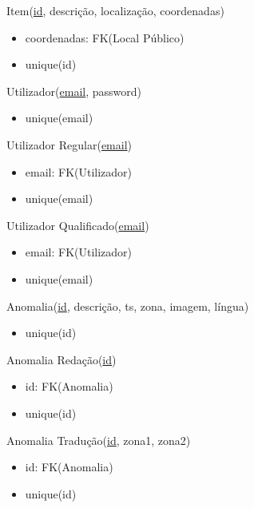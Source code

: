 \documentclass[12pt]{report}
\begin{document}
\begin{multicols}{2}
Item(\underline{id}, descrição, localização, coordenadas)
    \begin{itemize}
    \item coordenadas: FK(Local Público)
    \item unique(id)
    \end{itemize}

\vspace{5mm}


Utilizador(\underline{email}, password)
    \begin{itemize}
    \item unique(email)
    \end{itemize}


Utilizador Regular(\underline{email})
    \begin{itemize}
    \item email: FK(Utilizador)
    \item unique(email)
    \end{itemize}


Utilizador Qualificado(\underline{email})
    \begin{itemize}
    \item email: FK(Utilizador)
    \item unique(email)
    \end{itemize}

\vspace{5mm}



Anomalia(\underline{id}, descrição, ts, zona, imagem, língua)
    \begin{itemize}
    \item unique(id)
    \end{itemize}


Anomalia Redação(\underline{id})
    \begin{itemize}
    \item id: FK(Anomalia)
    \item unique(id)
    \end{itemize}


Anomalia Tradução(\underline{id}, zona1, zona2)
    \begin{itemize}
    \item id: FK(Anomalia)
    \item unique(id)
    \end{itemize}



\end{multicols}
\end{document}

